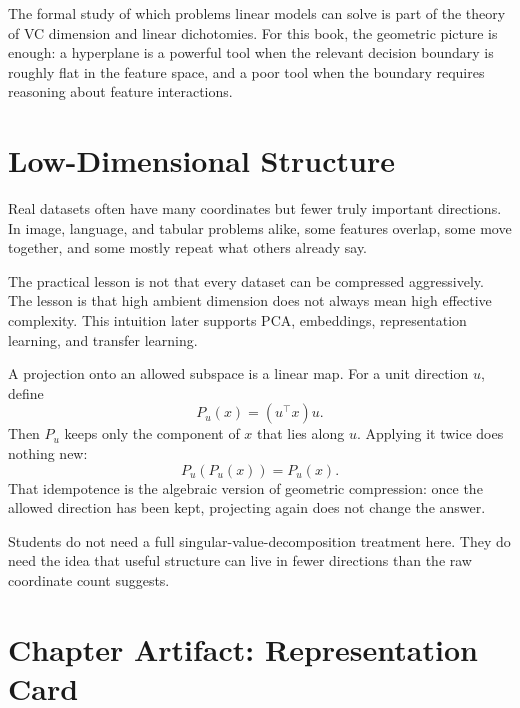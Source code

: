 \begin{advancednote}
The formal study of which problems linear models can solve is part of the theory of VC dimension and linear dichotomies. For this book, the geometric picture is enough: a hyperplane is a powerful tool when the relevant decision boundary is roughly flat in the feature space, and a poor tool when the boundary requires reasoning about feature interactions.
\end{advancednote}

\section*{Low-Dimensional Structure}

Real datasets often have many coordinates but fewer truly important directions. In image, language, and tabular problems alike, some features overlap, some move together, and some mostly repeat what others already say.

The practical lesson is not that every dataset can be compressed aggressively. The lesson is that high ambient dimension does not always mean high effective complexity. This intuition later supports PCA, embeddings, representation learning, and transfer learning.

\begin{mathlens}
A projection onto an allowed subspace is a linear map. For a unit direction \(u\), define
\[
P_u(x)=(u^\top x)u.
\]
Then \(P_u\) keeps only the component of \(x\) that lies along \(u\). Applying it twice does nothing new:
\[
P_u(P_u(x))=P_u(x).
\]
That idempotence is the algebraic version of geometric compression: once the allowed direction has been kept, projecting again does not change the answer.
\end{mathlens}

Students do not need a full singular-value-decomposition treatment here. They do need the idea that useful structure can live in fewer directions than the raw coordinate count suggests.

\section*{Chapter Artifact: Representation Card}

